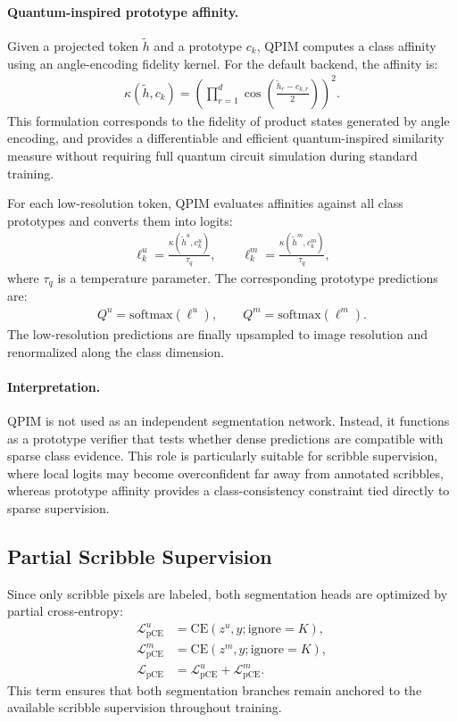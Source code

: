 \paragraph{Quantum-inspired prototype affinity.}
Given a projected token $\tilde{h}$ and a prototype $c_k$, QPIM computes a class affinity using an angle-encoding fidelity kernel. For the default backend, the affinity is:
\begin{align}
    \kappa(\tilde{h}, c_k)
    = \left(
    \prod_{r=1}^{d}
    \cos\left(\frac{\tilde{h}_r - c_{k,r}}{2}\right)
    \right)^2.
\end{align}
This formulation corresponds to the fidelity of product states generated by angle encoding, and provides a differentiable and efficient quantum-inspired similarity measure without requiring full quantum circuit simulation during standard training.

For each low-resolution token, QPIM evaluates affinities against all class prototypes and converts them into logits:
\begin{align}
    \ell^u_{k} = \frac{\kappa(\tilde{h}^u, c_k^u)}{\tau_q}, \qquad
    \ell^m_{k} = \frac{\kappa(\tilde{h}^m, c_k^m)}{\tau_q},
\end{align}
where $\tau_q$ is a temperature parameter. The corresponding prototype predictions are:
\begin{align}
    Q^u = \mathrm{softmax}(\ell^u), \qquad
    Q^m = \mathrm{softmax}(\ell^m).
\end{align}
The low-resolution predictions are finally upsampled to image resolution and renormalized along the class dimension.

\paragraph{Interpretation.}
QPIM is not used as an independent segmentation network. Instead, it functions as a prototype verifier that tests whether dense predictions are compatible with sparse class evidence. This role is particularly suitable for scribble supervision, where local logits may become overconfident far away from annotated scribbles, whereas prototype affinity provides a class-consistency constraint tied directly to sparse supervision.

\subsection{Partial Scribble Supervision}
\label{subsec:partial_scribble_supervision}
Since only scribble pixels are labeled, both segmentation heads are optimized by partial cross-entropy:
\begin{align}
    \mathcal{L}_{\mathrm{pCE}}^u &= \mathrm{CE}(z^u, y; \mathrm{ignore}=K), \\
    \mathcal{L}_{\mathrm{pCE}}^m &= \mathrm{CE}(z^m, y; \mathrm{ignore}=K), \\
    \mathcal{L}_{\mathrm{pCE}} &= \mathcal{L}_{\mathrm{pCE}}^u + \mathcal{L}_{\mathrm{pCE}}^m.
\end{align}
This term ensures that both segmentation branches remain anchored to the available scribble supervision throughout training.

